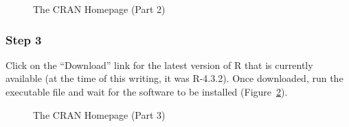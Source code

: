 \documentclass[
  letterpaper,
  DIV=11,
  numbers=noendperiod]{scrreprt}
\begin{document}
\begin{figure}


\caption{\label{fig-cran-2}The CRAN Homepage (Part 2)}

\end{figure}%

\subsubsection{Step 3}\label{step-3}

Click on the ``Download'' link for the latest version of R that is
currently available (at the time of this writing, it was R-4.3.2). Once
downloaded, run the executable file and wait for the software to be
installed (Figure~\ref{fig-cran-3}).

\begin{figure}


\caption{\label{fig-cran-3}The CRAN Homepage (Part 3)}

\end{figure}%
\end{document}
